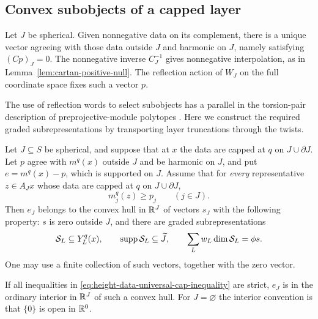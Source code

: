 \subsection{Convex subobjects of a capped layer}

Let $J$ be spherical.  Given nonnegative data on its
complement, there is a unique vector agreeing with those
data outside $J$ and harmonic on $J$, namely satisfying
$(Cp)_J=0$.  The nonnegative inverse $C_J^{-1}$ gives
nonnegative interpolation, as in
Lemma~\ref{lem:cartan-positive-null}.  The reflection
action of $W_J$ on the full coordinate space fixes such
a vector $p$.

The use of reflection words to select subobjects has a parallel
in the torsion-pair description of preprojective-module polytopes
\cite[Sections~3.2, 5.4 and~5.6]{BaumannKamnitzerTingley2014}.
Here we construct the required graded subrepresentations by
transporting layer truncations through the twists.

\begin{proposition}
\label{prop:convex-subobjects}
Let $J\subseteq S$ be spherical, and suppose that at
$x$ the data are capped at $q$ on $J\cup\partial J$.
Let $p$ agree with $m^q(x)$ outside $J$ and be harmonic
on $J$, and put $e=m^q(x)-p$, which is supported on $J$.
Assume that for \emph{every} representative $z\in A_Jx$
whose data are capped at $q$ on $J\cup\partial J$,
\begin{equation}
 m_j^q(z)\geq p_j\qquad(j\in J).
 \label{eq:height-data-universal-cap-inequality}
\end{equation}
Then $e_J$ belongs to the convex hull in $\mathbb R^J$ of
vectors $s_J$ with the following property: $s$ is zero
outside $J$, and there are graded subrepresentations
\begin{equation}
 \mathcal S_L\subseteq Y_L^q(x),\qquad
 \operatorname{supp}\mathcal S_L\subseteq\widetilde J,
 \qquad
 \sum_Lw_L\dim\mathcal S_L=\phi s.
 \label{eq:height-data-convex-subrepresentations}
\end{equation}
One may use a finite collection of such vectors,
together with the zero vector.

If all inequalities in
\eqref{eq:height-data-universal-cap-inequality} are
strict, $e_J$ is in the ordinary interior in $\mathbb R^J$
of such a convex hull.  For $J=\varnothing$ the
interior convention is that $\{0\}$ is open in
$\mathbb R^0$.
\end{proposition}

